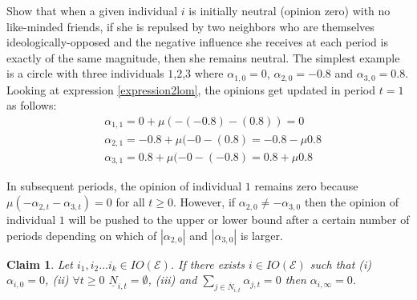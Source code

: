 \documentclass{article}
\newtheorem{claim}{Claim}
\begin{document}
 Show that when a given individual $i$ is initially neutral (opinion zero) with no like-minded friends, if she is repulsed by two neighbors who are themselves ideologically-opposed and the negative influence she receives at each period is exactly of the same magnitude, then she remains neutral. The simplest example is a circle with three individuals $1$,$2$,$3$ where $\alpha_{1,0}=0$, $\alpha_{2,0}=-0.8$ and $\alpha_{3,0}=0.8$. Looking at expression \eqref{expression2lom}, the opinions get updated in period $t=1$ as follows: 
\begin{align*}
& \alpha_{1,1} =  0 + \mu ( - (-0.8) - (0.8) ) = 0 \\
& \alpha_{2,1} =  -0.8 + \mu ( - 0 - (0.8 )  = -0.8 - \mu 0.8 \\
& \alpha_{3,1} =   0.8 + \mu ( - 0 - (-0.8 )  = 0.8 + \mu 0.8 
\end{align*} 

\noindent In subsequent periods, the opinion of individual $1$ remains zero because $\mu ( - \alpha_{2,t} - \alpha_{3,t} ) = 0$ for all $t \geq 0$. However, if $\alpha_{2,0} \neq - \alpha_{3,0}$ then the opinion of individual $1$ will be pushed to the upper or lower bound after a certain number of periods depending on which of $|\alpha_{2,0}|$ and $|\alpha_{3,0}|$ is larger. 

\vspace{3mm}
\begin{claim} Let $i_1, i_2 \ldots i_k \in IO(\mathcal{E})$. If there exists $i  \in IO(\mathcal{E})$ such that (i) $\alpha_{i,0}=0$, (ii)  $\forall t \geq 0$ $\underline{N}_{i,t} = \emptyset$, (iii) and $\sum_{j \in \overline{N}_{i,t}} \alpha_{j,t}=0$ then $\alpha_{i,\infty}=0$.
\end{claim}
\end{document}
